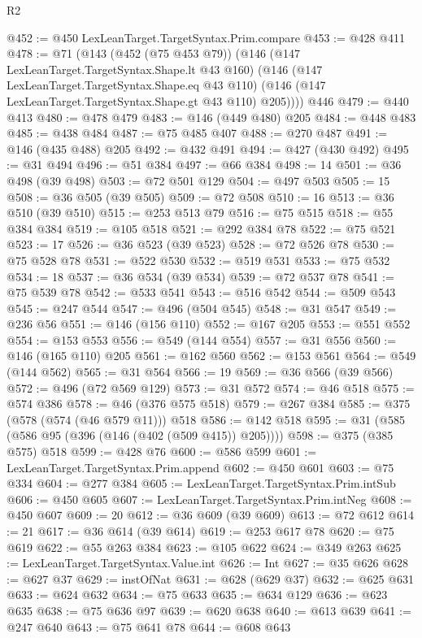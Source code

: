 \begin{lexlean}{R2}
\begin{coremodule}
@452 := @450 LexLeanTarget.TargetSyntax.Prim.compare
@453 := @428 @411
@478 := @71
    (@143
      (@452 (@75 @453 @79))
      (@146
        (@147 LexLeanTarget.TargetSyntax.Shape.lt @43 @160)
        (@146
          (@147 LexLeanTarget.TargetSyntax.Shape.eq @43 @110)
          (@146 (@147 LexLeanTarget.TargetSyntax.Shape.gt @43 @110) @205))))
    @446
@479 := @440 @413
@480 := @478 @479
@483 := @146 (@449 @480) @205
@484 := @448 @483
@485 := @438 @484
@487 := @75 @485 @407
@488 := @270 @487
@491 := @146 (@435 @488) @205
@492 := @432 @491
@494 := @427 (@430 @492)
@495 := @31 @494
@496 := @51 @384
@497 := @66 @384
@498 := 14
@501 := @36 @498 (@39 @498)
@503 := @72 @501 @129
@504 := @497 @503
@505 := 15
@508 := @36 @505 (@39 @505)
@509 := @72 @508
@510 := 16
@513 := @36 @510 (@39 @510)
@515 := @253 @513 @79
@516 := @75 @515
@518 := @55 @384 @384
@519 := @105 @518
@521 := @292 @384 @78
@522 := @75 @521
@523 := 17
@526 := @36 @523 (@39 @523)
@528 := @72 @526 @78
@530 := @75 @528 @78
@531 := @522 @530
@532 := @519 @531
@533 := @75 @532
@534 := 18
@537 := @36 @534 (@39 @534)
@539 := @72 @537 @78
@541 := @75 @539 @78
@542 := @533 @541
@543 := @516 @542
@544 := @509 @543
@545 := @247 @544
@547 := @496 (@504 @545)
@548 := @31 @547
@549 := @236 @56
@551 := @146 (@156 @110)
@552 := @167 @205
@553 := @551 @552
@554 := @153 @553
@556 := @549 (@144 @554)
@557 := @31 @556
@560 := @146 (@165 @110) @205
@561 := @162 @560
@562 := @153 @561
@564 := @549 (@144 @562)
@565 := @31 @564
@566 := 19
@569 := @36 @566 (@39 @566)
@572 := @496 (@72 @569 @129)
@573 := @31 @572
@574 := @46 @518
@575 := @574 @386
@578 := @46 (@376 @575 @518)
@579 := @267 @384
@585 := @375 (@578 (@574 (@46 @579 @11))) @518
@586 := @142 @518
@595 := @31 (@585 (@586 @95 (@396 (@146 (@402 (@509 @415)) @205))))
@598 := @375 (@385 @575) @518
@599 := @428 @76
@600 := @586 @599
@601 := LexLeanTarget.TargetSyntax.Prim.append
@602 := @450 @601
@603 := @75 @334
@604 := @277 @384
@605 := LexLeanTarget.TargetSyntax.Prim.intSub
@606 := @450 @605
@607 := LexLeanTarget.TargetSyntax.Prim.intNeg
@608 := @450 @607
@609 := 20
@612 := @36 @609 (@39 @609)
@613 := @72 @612
@614 := 21
@617 := @36 @614 (@39 @614)
@619 := @253 @617 @78
@620 := @75 @619
@622 := @55 @263 @384
@623 := @105 @622
@624 := @349 @263
@625 := LexLeanTarget.TargetSyntax.Value.int
@626 := Int
@627 := @35 @626
@628 := @627 @37
@629 := instOfNat
@631 := @628 (@629 @37)
@632 := @625 @631
@633 := @624 @632
@634 := @75 @633
@635 := @634 @129
@636 := @623 @635
@638 := @75 @636 @97
@639 := @620 @638
@640 := @613 @639
@641 := @247 @640
@643 := @75 @641 @78
@644 := @608 @643

\end{coremodule}
\end{lexlean}
